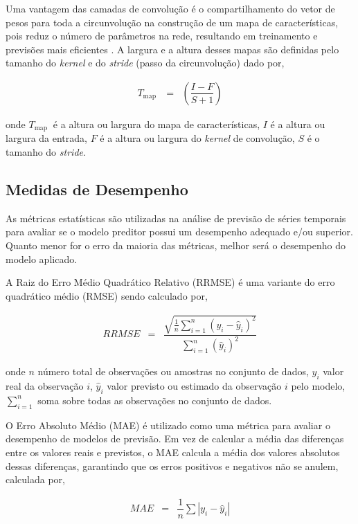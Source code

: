 Uma vantagem das camadas de convolução é o compartilhamento do vetor de pesos para toda a circunvolução na construção de um mapa de características, pois reduz o número de parâmetros na rede, resultando em treinamento e previsões mais eficientes \cite{lucas_2019}.
A largura e a altura desses mapas são definidas pelo tamanho do \textit{kernel} e do \textit{stride} (passo da circunvolução) dado por,
 
 \begin{eqnarray}
 	T_{\text {map }}&=&\left(\dfrac{I-F}{S+1}\right)\label{cnn1}
 \end{eqnarray}
 
 \noindent onde
 $T_{\text {map }}$ é a altura ou largura do mapa de características,
 $I$ é a altura ou largura da entrada,
 $F$ é a altura ou largura do \textit{kernel} de convolução,
 $S$ é o tamanho do \textit{stride}.
 
 \subsection{Medidas de Desempenho}\label{subsec:metrica}
 
As métricas estatísticas são utilizadas na análise de previsão de séries temporais para avaliar se o modelo preditor possui um desempenho adequado e/ou superior. Quanto menor for o erro da maioria das métricas, melhor será o desempenho do modelo aplicado.
 
A Raiz do Erro Médio Quadrático Relativo (RRMSE) é uma variante do erro quadrático médio (RMSE) sendo calculado por,
 
 \begin{eqnarray}
 	R R M S E&=&\dfrac{\sqrt{\frac{1}{n} \sum_{i=1}^n\left(y_i-\hat{y}_i\right)^2}}{\sum_{i=1}^n\left(\hat{y}_i\right)^2}
 \end{eqnarray}
 
 \noindent onde $n$ número total de observações ou amostras no conjunto de dados,
 $y_i$ valor real da observação $i$,
 $\hat{y}_i$ valor previsto ou estimado da observação $i$ pelo modelo,
 $\sum_{i=1}^{n}$ soma sobre todas as observações no conjunto de dados.
 
O Erro Absoluto Médio (MAE) é utilizado como uma métrica para avaliar o desempenho de modelos de previsão. Em vez de calcular a média das diferenças entre os valores reais e previstos, o MAE calcula a média dos valores absolutos dessas diferenças, garantindo que os erros positivos e negativos não se anulem, calculada por,
 
 \begin{eqnarray}
 	M A E &=& \dfrac{1}{n} \sum\left|y_i-\hat{y}_i\right|\label{eq:mae}
 \end{eqnarray}
 
